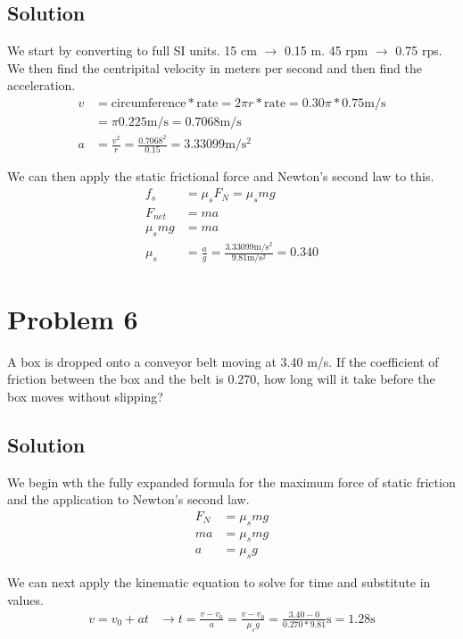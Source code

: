 \documentclass[12pt]{article}
\begin{document}
\subsection*{Solution}
We start by converting to full SI units. 15 cm $\rightarrow$ 0.15 m. 45 rpm $\rightarrow$ 0.75 rps. We then find the centripital velocity in meters per second and then find the acceleration. 
\begin{align*}
    v   &= \text{circumference} * \text{rate} 
        = 2\pi r * \text{rate} 
        = 0.30\pi * 0.75 \unit{\meter/\second}\\
        &= \pi 0.225 \unit{\meter/\second} 
        = 0.7068 \unit{\meter/\second}\\
    a   &= \frac{v^2}{r} 
        = \frac{0.7068^2}{0.15} 
        = 3.33099\unit{\meter/\second^2}
\end{align*}

We can then apply the static frictional force and Newton's second law to this.
\begin{align*}
    f_s     &= \mu_s F_N 
            = \mu_s mg\\
    F_{net} &= ma\\
    \mu_s mg &= ma\\
    \mu_s   &= \frac{a}{g} 
            = \frac{3.33099\unit{\meter/\second^2}}{9.81\unit{\meter/\second^2}}
            = \boxed{0.340}
\end{align*}

\pagebreak
\section*{Problem 6}
A box is dropped onto a conveyor belt moving at 3.40 m/s. If the coefficient of friction between the box and the belt is 0.270, how long will it take before the box moves without slipping?

\subsection*{Solution}
We begin wth the fully expanded formula for the maximum force of static friction and the application to Newton's second law.
\begin{align*}
    F_N &= \mu_s mg\\
    ma &= \mu_s mg\\
    a &= \mu_s g
\end{align*}

We can next apply the kinematic equation to solve for time and substitute in values.
\begin{align*}
    v = v_0 + at &\rightarrow t = \frac{v - v_0}{a} = \frac{v - v_0}{\mu_s g} 
                                = \frac{3.40 - 0}{0.270*9.81} \unit{\second}
                                = \boxed{1.28 \unit{\second}}
\end{align*}
\end{document}
